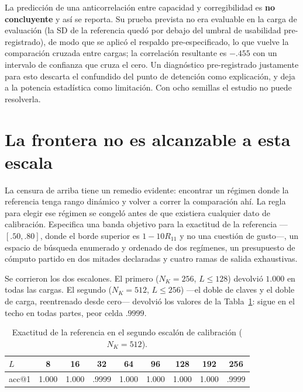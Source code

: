 \documentclass[jou,11pt,donotrepeattitle]{apa7}
\begin{document}
La predicci\'on de una anticorrelaci\'on entre capacidad y corregibilidad es \textbf{no
concluyente} y as\'i se reporta. Su prueba prevista no era evaluable en la carga de evaluaci\'on
(la SD de la referencia qued\'o por debajo del umbral de usabilidad pre-registrado), de modo que
se aplic\'o el respaldo pre-especificado, lo que vuelve la comparaci\'on cruzada entre cargas;
la correlaci\'on resultante es $-.455$ con un intervalo de confianza que cruza el cero. Un
diagn\'ostico pre-registrado justamente para esto descarta el confundido del punto de detenci\'on
como explicaci\'on, y deja a la potencia estad\'istica como limitaci\'on. Con ocho semillas el
estudio no puede resolverla.

\section{La frontera no es alcanzable a esta escala}

La censura de arriba tiene un remedio evidente: encontrar un r\'egimen donde la referencia tenga
rango din\'amico y volver a correr la comparaci\'on ah\'i. La regla para elegir ese r\'egimen se
congel\'o antes de que existiera cualquier dato de calibraci\'on. Especifica una banda objetivo
para la exactitud de la referencia ---$[.50, .80]$, donde el borde superior es $1-10R_{11}$ y no
una cuesti\'on de gusto---, un espacio de b\'usqueda enumerado y ordenado de dos reg\'imenes, un
presupuesto de c\'omputo partido en dos mitades declaradas y cuatro ramas de salida exhaustivas.

Se corrieron los dos escalones. El primero ($N_K=256$, $L\le128$) devolvi\'o $1.000$ en todas
las cargas. El segundo ($N_K=512$, $L\le256$) ---el doble de claves y el doble de carga,
reentrenado desde cero--- devolvi\'o los valores de la Tabla~\ref{tab:escalones}: sigue en el
techo en todas partes, peor celda $.9999$.

\begin{table}[htbp]
\centering
\caption{Exactitud de la referencia en el segundo escal\'on de calibraci\'on ($N_K=512$).}
\label{tab:escalones}
\begin{tabular}{lcccccccc}
\toprule
$L$ & 8 & 16 & 32 & 64 & 96 & 128 & 192 & 256 \\
\midrule
acc@1 & 1.000 & 1.000 & .9999 & 1.000 & 1.000 & 1.000 & 1.000 & .9999 \\
\bottomrule
\end{tabular}
\end{table}
\end{document}

